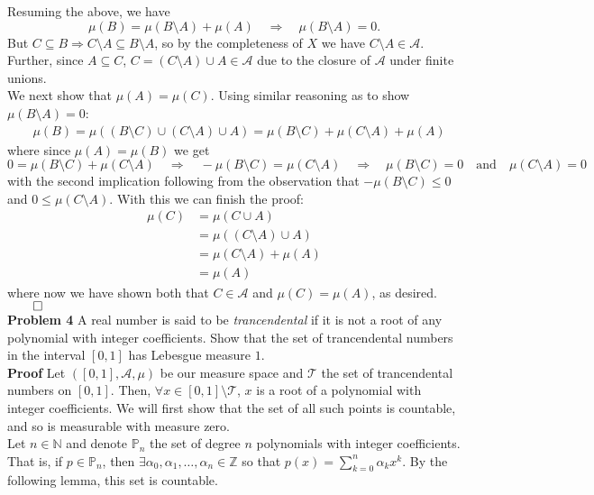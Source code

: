 \documentclass[11pt, letterpaper]{article}
\newcommand{\mbb}[1]{\mathbb{#1}}
\newcommand{\mc}[1]{\mathcal{#1}}
\begin{document}
    Resuming the above, we have
    \[\mu(B)=\mu(B\setminus A)+\mu(A)\quad\Rightarrow\quad \mu(B\setminus A)=0.\tag{since $\mu(A)=\mu(B)$}\]
    But $C\subseteq B\Rightarrow C\setminus A\subseteq B\setminus A$, so by the completeness of $X$ we have $C\setminus A\in\mc{A}$. Further, since $A\subseteq C$, $C=(C\setminus A)\cup A\in\mc{A}$ due to the closure of $\mc{A}$ under finite unions.\\[10pt]
    We next show that $\mu(A)=\mu(C)$. Using similar reasoning as to show $\mu(B\setminus A)=0$:
    \begin{align*}
        &\mu(B)=\mu((B\setminus C)\cup(C\setminus A)\cup A)=\mu(B\setminus C)+\mu(C\setminus A)+\mu(A)\tag{finite additivity}
    \end{align*}
    where since $\mu(A)=\mu(B)$ we get
    \[0=\mu(B\setminus C)+\mu(C\setminus A)\quad\Rightarrow\quad-\mu(B\setminus C)=\mu(C\setminus A)\quad\Rightarrow\quad\mu(B\setminus C)=0\quad\text{and}\quad\mu(C\setminus A)=0\]
    with the second implication following from the observation that $-\mu(B\setminus C)\leq 0$ and $0\leq\mu(C\setminus A)$. With this we can finish the proof: 
    \begin{align*}
        \mu(C)&=\mu(C\cup A)\tag{since $A\subseteq C$}\\
        &=\mu((C\setminus A)\cup A)\\
        &=\mu(C\setminus A)+\mu(A)\tag{since $(C\setminus A)\cap A=\emptyset$}\\
        &=\mu(A)\tag{since $\mu(C\setminus A)=0$}
    \end{align*}
    where now we have shown both that $C\in\mc{A}$ and $\mu(C)=\mu(A)$, as desired.\hfill{$\qed$}\\[10pt]
    {\bf Problem 4} A real number is said to be {\it trancendental} if it is not a root of any polynomial with integer coefficients. Show that the set of trancendental numbers
    in the interval $[0,1]$ has Lebesgue measure $1$.\\[10pt]
    {\bf Proof} Let $([0,1],\mc{A},\mu)$ be our measure space and $\mc{T}$ the set of trancendental numbers on $[0,1]$. Then, $\forall x\in[0,1]\setminus\mc{T}$, $x$ is a root of a polynomial with integer coefficients. We will first show that the set of all such points is countable,
    and so is measurable with measure zero.\\[10pt]
    Let $n\in\mbb{N}$ and denote $\mbb{P}_n$ the set of degree $n$ polynomials with integer coefficients. That is, if $p\in\mbb{P}_n$, then $\exists \alpha_0,\alpha_1,\dots,\alpha_n\in\mbb{Z}$ so that $p(x)=\sum_{k=0}^n\alpha_kx^k$. By the following lemma, this set is countable.
\end{document}
